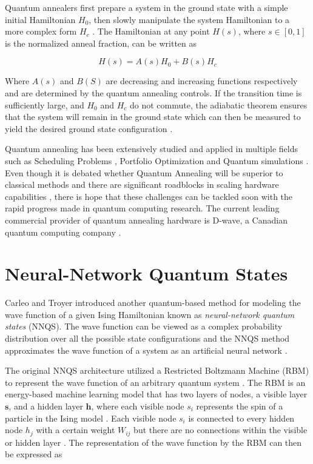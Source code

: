 Quantum annealers first prepare a system in the ground state with a simple initial Hamiltonian $H_0$, then slowly manipulate the system Hamiltonian to a more complex form $H_c$ \cite{b10}. The Hamiltonian at any point $H(s)$, where $s \in [0,1]$ is the normalized anneal fraction, can be written as

\begin{equation}
    \label{eqn:annealinghamiltonian}
    H(s) = A(s)H_0 + B(s)H_c
\end{equation}

Where $A(s)$ and $B(S)$ are decreasing and increasing functions respectively and are determined by the quantum annealing controls. If the transition time is sufficiently large, and $H_0$ and $H_c$ do not commute, the adiabatic theorem ensures that the system will remain in the ground state which can then be measured to yield the desired ground state configuration \cite{b14}.

Quantum annealing has been extensively studied and applied in multiple fields such as Scheduling Problems \cite{b17}, Portfolio Optimization \cite{b18} and Quantum simulations \cite{b19}. Even though it is debated whether Quantum Annealing will be superior to classical methods \cite{b10} and there are significant roadblocks in scaling hardware capabilities \cite{b14}, there is hope that these challenges can be tackled soon with the rapid progress made in quantum computing research. The current leading commercial provider of quantum annealing hardware is D-wave, a Canadian quantum computing company \cite{b16}.

\section{Neural-Network Quantum States}
Carleo and Troyer \cite{b20} introduced another quantum-based method for modeling the wave function of a given Ising Hamiltonian known as \textit{neural-network quantum states} (NNQS). The wave function can be viewed as a complex probability distribution over all the possible state configurations and the NNQS method approximates the wave function of a system as an artificial neural network \cite{b25}. 

The original NNQS architecture utilized a Restricted Boltzmann Machine (RBM) to represent the wave function of an arbitrary quantum system \cite{b20}. The RBM is an energy-based machine learning model that has two layers of nodes, a visible layer $\boldsymbol{s}$, and a hidden layer $\boldsymbol{h}$, where each visible node $s_i$ represents the spin of a particle in the Ising model \cite{b20}. Each visible node $s_i$ is connected to every hidden node $h_j$ with a certain weight $W_{ij}$ but there are no connections within the visible or hidden layer \cite{b20}. The representation of the wave function by the RBM can then be expressed as

